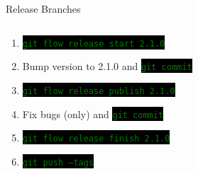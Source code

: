 \documentclass[
14pt,
aspectratio=169,
usenames,
dvipsnames,
x11names]{beamer}
\newcommand{\code}[1]{{\small\colorbox{black}{\textcolor{green}{\texttt{#1}}}}}
\newcommand{\shadowbox}[2]{%
  \hbox{%
    \begin{tcolorbox}[beamer,
      width=#1,
      drop fuzzy shadow=black,
      arc=0pt,
      boxsep=0pt,
      left=0pt,right=0pt,top=0pt,bottom=0pt,
      ]%
      #2
    \end{tcolorbox}
  }
}
\begin{document}
\begin{frame}{Release Branches}
  \begin{columns}
    \begin{column}{.62\linewidth}
      \minipage[c][0.75\textheight][s]{\columnwidth}
      \begin{enumerate} \setlength{\itemsep}{\fill}
      \item \code{git flow release start 2.1.0}
      \item Bump version to 2.1.0 and \code{git commit}
      \item \code{git flow release publish 2.1.0}
      \item Fix bugs (only) and \code{git commit}
      \item \code{git flow release finish 2.1.0}
      \item \code{git push --tags}
      \end{enumerate}
      \endminipage
    \end{column}
  \end{columns}
\end{frame}
\end{document}
